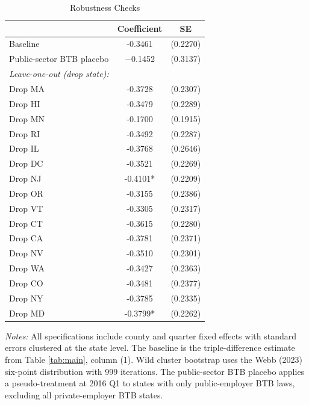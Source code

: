 \begin{table}[htbp]
\centering
\caption{Robustness Checks}
\label{tab:robustness}
\begin{tabular}{lcc}
\hline\hline
 & Coefficient & SE \\
\hline
Baseline & -0.3461 & (0.2270) \\
Public-sector BTB placebo & $-$0.1452 & (0.3137) \\
\hline
\textit{Leave-one-out (drop state):} & & \\
\quad Drop MA & -0.3728 & (0.2307) \\
\quad Drop HI & -0.3479 & (0.2289) \\
\quad Drop MN & -0.1700 & (0.1915) \\
\quad Drop RI & -0.3492 & (0.2287) \\
\quad Drop IL & -0.3768 & (0.2646) \\
\quad Drop DC & -0.3521 & (0.2269) \\
\quad Drop NJ & -0.4101* & (0.2209) \\
\quad Drop OR & -0.3155 & (0.2386) \\
\quad Drop VT & -0.3305 & (0.2317) \\
\quad Drop CT & -0.3615 & (0.2280) \\
\quad Drop CA & -0.3781 & (0.2371) \\
\quad Drop NV & -0.3510 & (0.2301) \\
\quad Drop WA & -0.3427 & (0.2363) \\
\quad Drop CO & -0.3481 & (0.2377) \\
\quad Drop NY & -0.3785 & (0.2335) \\
\quad Drop MD & -0.3799* & (0.2262) \\
\hline\hline
\end{tabular}
\begin{tablenotes}[flushleft]\footnotesize
\item \textit{Notes:} All specifications include county and quarter fixed effects with standard errors clustered at the state level. The baseline is the triple-difference estimate from Table \ref{tab:main}, column (1). Wild cluster bootstrap uses the Webb (2023) six-point distribution with 999 iterations. The public-sector BTB placebo applies a pseudo-treatment at 2016 Q1 to states with only public-employer BTB laws, excluding all private-employer BTB states.
\end{tablenotes}
\end{table}
